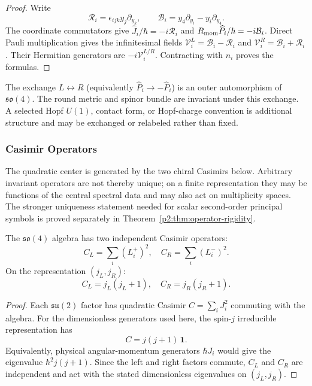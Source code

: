 \documentclass[12pt,a4paper]{article}
\begin{document}
\begin{proof}
Write
\[
 \mathcal R_i=\epsilon_{ijk}y_j\partial_{y_k},\qquad
 \mathcal B_i=y_4\partial_{y_i}-y_i\partial_{y_4}.
\]
The coordinate commutators give
\(\widehat J_i/\hbar=-i\mathcal R_i\) and
\(R_{\mathrm{mom}}\widehat P_i/\hbar=-i\mathcal B_i\).
Direct Pauli multiplication gives the infinitesimal fields
\(\mathcal V_i^L=\mathcal B_i-\mathcal R_i\) and
\(\mathcal V_i^R=\mathcal B_i+\mathcal R_i\).
Their Hermitian generators are \(-i\mathcal V_i^{L/R}\).
Contracting with \(n_i\) proves the formulas.
\end{proof}

\begin{remark}
The exchange $L \leftrightarrow R$ (equivalently $\hat{P}_i \to -\hat{P}_i$) is an outer automorphism of $\mathfrak{so}(4)$. The round metric and spinor bundle are invariant under this exchange.  A selected Hopf $U(1)$, contact form, or Hopf-charge convention is additional structure and may be exchanged or relabeled rather than fixed.
\end{remark}

\subsubsection{Casimir Operators}

The quadratic center is generated by the two chiral Casimirs below.
Arbitrary invariant operators are not thereby unique; on a finite
representation they may be functions of the central spectral data and may
also act on multiplicity spaces.  The stronger uniqueness statement needed
for scalar second-order principal symbols is proved separately in
Theorem~\ref{p2:thm:operator-rigidity}.

\begin{proposition}
\label{p2:prop:casimir}
The $\mathfrak{so}(4)$ algebra has two independent Casimir operators: \cite{Hall2015lie}
\begin{equation}
C_L = \sum_i (L^+_i)^2, \quad C_R = \sum_i (L^-_i)^2.
\end{equation}
On the representation \((j_L,j_R)\):
\begin{equation}
C_L = j_L(j_L+1), \quad C_R = j_R(j_R+1).
\end{equation}
\end{proposition}

\begin{proof}
Each $\mathfrak{su}(2)$ factor has quadratic Casimir $C=\sum_i J_i^2$ commuting with the algebra.
For the dimensionless generators used here, the spin-$j$ irreducible representation has
\[
C=j(j+1)\,\mathbf 1.
\]
Equivalently, physical angular-momentum generators $\hbar J_i$ would give the eigenvalue $\hbar^2j(j+1)$.
Since the left and right factors commute, $C_L$ and $C_R$ are independent and act with the stated dimensionless eigenvalues on $(j_L,j_R)$.
\end{proof}
\end{document}
